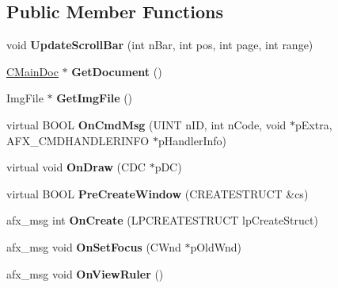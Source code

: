 \subsection*{Public Member Functions}
\begin{DoxyCompactItemize}
\item 
\mbox{\label{class_c_main_view_a5bf6e026f365e546ca8374b5abd645ad}} 
void {\bfseries Update\+Scroll\+Bar} (int n\+Bar, int pos, int page, int range)
\item 
\mbox{\label{class_c_main_view_a83cc03d948f6cc6c340d54bcb7b7e82f}} 
\mbox{\hyperlink{class_c_main_doc}{C\+Main\+Doc}} $\ast$ {\bfseries Get\+Document} ()
\item 
\mbox{\label{class_c_main_view_ab6591df421b218553f828f82510bf894}} 
Img\+File $\ast$ {\bfseries Get\+Img\+File} ()
\item 
\mbox{\label{class_c_main_view_aa0751b941709df63bddf26f5db864fc6}} 
virtual B\+O\+OL {\bfseries On\+Cmd\+Msg} (U\+I\+NT n\+ID, int n\+Code, void $\ast$p\+Extra, A\+F\+X\+\_\+\+C\+M\+D\+H\+A\+N\+D\+L\+E\+R\+I\+N\+FO $\ast$p\+Handler\+Info)
\item 
\mbox{\label{class_c_main_view_a4f5be0f4b4dc0f6a763235a945f235b8}} 
virtual void {\bfseries On\+Draw} (C\+DC $\ast$p\+DC)
\item 
\mbox{\label{class_c_main_view_a1d20bfde9a44e6276224976590265145}} 
virtual B\+O\+OL {\bfseries Pre\+Create\+Window} (C\+R\+E\+A\+T\+E\+S\+T\+R\+U\+CT \&cs)
\item 
\mbox{\label{class_c_main_view_a6f7ba208c41d8e0e1ad4f3796713b0b4}} 
afx\+\_\+msg int {\bfseries On\+Create} (L\+P\+C\+R\+E\+A\+T\+E\+S\+T\+R\+U\+CT lp\+Create\+Struct)
\item 
\mbox{\label{class_c_main_view_ab4cedd67cf9ccc27d1377da0d3ba74e3}} 
afx\+\_\+msg void {\bfseries On\+Set\+Focus} (C\+Wnd $\ast$p\+Old\+Wnd)
\item 
\mbox{\label{class_c_main_view_a3aef8932f9fb39a00389267d964b9035}} 
afx\+\_\+msg void {\bfseries On\+View\+Ruler} ()

\end{DoxyCompactItemize}
